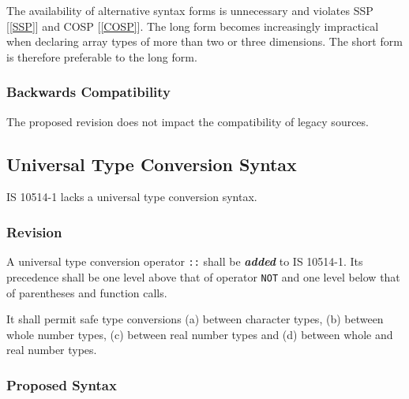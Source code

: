 \documentclass[10pt,a4paper,leqno,fleqn]{article}
\renewcommand{\emph}[1]{\textbf{\textit{#1}}}
\begin{document}
\par\noindent The availability of alternative syntax forms is unnecessary
and violates SSP [\ref{SSP}] and COSP [\ref{COSP}]. The long form becomes
increasingly impractical when declaring array types of more than two or three
dimensions. The short form is therefore preferable to the long form.

\subsubsection{Backwards Compatibility}

The proposed revision does not impact the compatibility of legacy sources.


\subsection{Universal Type Conversion Syntax}
\label{UTCS}

IS 10514-1 lacks a universal type conversion syntax.

\subsubsection{Revision}

A universal type conversion operator \verb|::| shall be \emph{added} to
IS 10514-1. Its precedence shall be one level above that of operator
\verb|NOT| and one level below that of parentheses and function calls.

It shall permit safe type conversions (a) between character types,
(b) between whole number types, (c) between real number types and (d)
between whole and real number types.


\subsubsection{Proposed Syntax}
\end{document}
